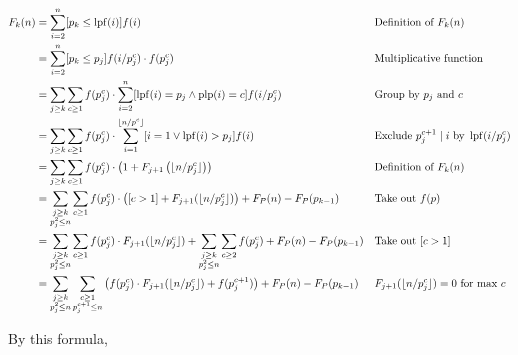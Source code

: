 \begin{align*}
  F_k(n) & = \sum_{i=2}^n[p_k\le\mathop{\rm lpf}(i)]f(i)                                                                &  & \text{Definition of }F_k(n)                            \\
         & = \sum_{i=2}^n[p_k\le p_j]f(i/p_j^c)\cdot f(p_j^c)                                               &  & \text{Multiplicative function}                         \\
         & = \sum_{j\ge k}\sum_{c\ge 1} f(p_j^c) \cdot \sum_{i=2}^n [\mathop{\rm lpf}(i)=p_j\wedge\mathop{\rm plp}(i)=c] f(i/p_j^c) &  & \text{Group by }p_j\text{ and }c                       \\
         & = \sum_{j\ge k}\sum_{c\ge 1} f(p_j^c) \cdot \sum_{i=1}^{\lfloor{n}/{p^c}\rfloor} [i=1\vee \mathop{\rm lpf}(i)>p_j] f(i)  &  & \text{Exclude }p_j^{c+1}\mid i\text{ by }\mathop{\rm lpf}(i/p_j^c) \\
         & = \sum_{j\ge k}\sum_{c\ge 1} f(p_j^c) \cdot \left(1+F_{j+1}\left({\lfloor{n}/{p_j^c}\rfloor}\right)\right)   &  & \text{Definition of }F_k(n)                            \\
         & = \sum_{\substack{j\ge k                                                                                                                                     \\p_j^2\le n}}\sum_{c\ge 1} f(p_j^c) \cdot \left([c>1]+F_{j+1}({\lfloor{n}/{p_j^c}\rfloor})\right) + F_P(n)-F_P(p_{k-1})                        &  & \text{Take out }f(p)                                \\
         & = \sum_{\substack{j\ge k                                                                                                                                     \\p_j^2\le n}}\sum_{c\ge 1} f(p_j^c) \cdot F_{j+1}({\lfloor{n}/{p_j^c}\rfloor})+\sum_{\substack{j\ge k                                                                                                                                     \\p_j^2\le n}}\sum_{c\ge 2}f(p_j^c)   +  F_P(n)-F_P(p_{k-1})                     &  & \text{Take out }[c>1]  \\
         & = \sum_{\substack{j\ge k                                                                                                                                     \\p_j^2\le n}}\sum_{\substack{c\ge 1\\p_j^{c+1}\le n}} \left(f(p_j^c) \cdot F_{j+1}({\lfloor{n}/{p_j^c}\rfloor})+f(p_j^{c+1})\right)   +  F_P(n)-F_P(p_{k-1})                     &  & F_{j+1}({\lfloor{n}/{p_j^c}\rfloor})=0\text{ for max } c  \\
\end{align*}

By this formula,